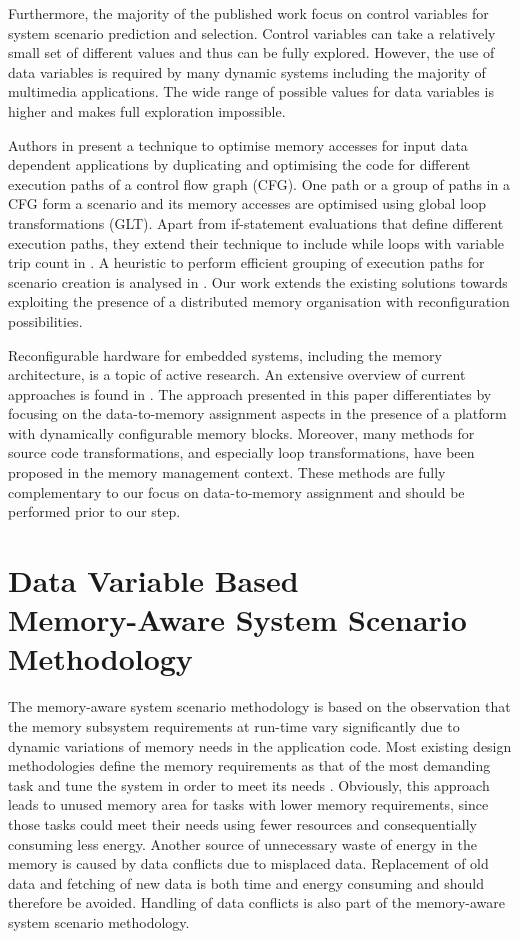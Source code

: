 \documentclass{acm_proc_article-sp}
\begin{document}
Furthermore, the majority of the published work focus on control variables for system scenario prediction and selection. Control variables can take a relatively small set of different values and thus can be fully explored. However, the use of data variables \cite{Elena2010} is required by many dynamic systems including the majority of multimedia applications. The wide range of possible values for data variables is higher and makes full exploration impossible. 

Authors in \cite{Pal06} present a technique to optimise memory accesses for input data dependent applications by duplicating and optimising the code for different execution paths of a control flow graph (CFG). One path or a group of paths in a CFG form a scenario and its memory accesses are optimised using global loop transformations (GLT). Apart from if-statement evaluations that define different execution paths, they extend their technique to include while loops with variable trip count in \cite{Pal06b}. A heuristic to perform efficient grouping of execution paths for scenario creation is analysed in \cite{Pal07}. Our work extends the existing solutions towards exploiting the presence of a distributed memory organisation with reconfiguration possibilities.

Reconfigurable hardware for embedded systems, including the memory architecture, is a topic of active research. An extensive overview of current approaches is found in \cite{Garcia}. The approach presented in this paper differentiates by focusing on the data-to-memory assignment aspects in the presence of a platform with dynamically configurable memory blocks. Moreover, many methods for source code transformations, and especially loop transformations, have been proposed in the memory management context. These methods are fully complementary to our focus on data-to-memory assignment and should be performed prior to our step. 

\section{Data Variable Based \\ Memory-Aware System Scenario Methodology}
\label{sec:methodology}

The memory-aware system scenario methodology is based on the observation that the memory subsystem requirements at run-time vary significantly due to dynamic variations of memory needs in the application code. Most existing design methodologies define the memory requirements as that of the most demanding task and tune the system in order to meet its needs \cite{tcm}. Obviously, this approach leads to unused memory area for tasks with lower memory requirements, since those tasks could meet their needs using fewer resources and consequentially consuming less energy. Another source of unnecessary waste of energy in the memory is caused by data conflicts due to misplaced data. Replacement of old data and fetching of new data is both time and energy consuming and should therefore be avoided. Handling of data conflicts is also part of the  memory-aware system scenario methodology.
\end{document}
